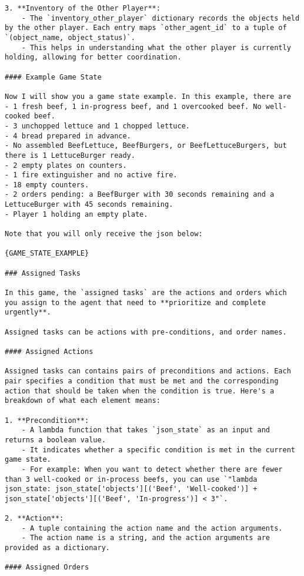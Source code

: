 \begin{lstlisting}
3. **Inventory of the Other Player**:
    - The `inventory_other_player` dictionary records the objects held by the other player. Each entry maps `other_agent_id` to a tuple of `(object_name, object_status)`.
    - This helps in understanding what the other player is currently holding, allowing for better coordination.

#### Example Game State

Now I will show you a game state example. In this example, there are
- 1 fresh beef, 1 in-progress beef, and 1 overcooked beef. No well-cooked beef.
- 3 unchopped lettuce and 1 chopped lettuce.
- 4 bread prepared in advance.
- No assembled BeefLettuce, BeefBurgers, or BeefLettuceBurgers, but there is 1 LettuceBurger ready.
- 2 empty plates on counters.
- 1 fire extinguisher and no active fire.
- 18 empty counters.
- 2 orders pending: a BeefBurger with 30 seconds remaining and a LettuceBurger with 45 seconds remaining.
- Player 1 holding an empty plate.

Note that you will only receive the json below:

{GAME_STATE_EXAMPLE}

### Assigned Tasks

In this game, the `assigned tasks` are the actions and orders which you assign to the agent that need to **prioritize and complete urgently**.

Assigned tasks can be actions with pre-conditions, and order names.

#### Assigned Actions

Assigned tasks can contains pairs of preconditions and actions. Each pair specifies a condition that must be met and the corresponding action that should be taken when the condition is true. Here's a breakdown of what each element means:

1. **Precondition**:
    - A lambda function that takes `json_state` as an input and returns a boolean value.
    - It indicates whether a specific condition is met in the current game state.
    - For example: When you want to detect whether there are fewer than 3 well-cooked or in-process beefs, you can use `"lambda json_state: json_state['objects'][('Beef', 'Well-cooked')] + json_state['objects'][('Beef', 'In-progress')] < 3"`.

2. **Action**:
    - A tuple containing the action name and the action arguments.
    - The action name is a string, and the action arguments are provided as a dictionary.

#### Assigned Orders


\end{lstlisting}

